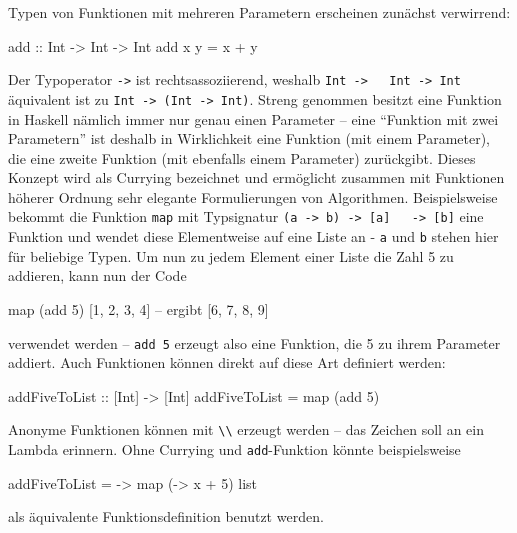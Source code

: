 \documentclass[12pt, a4paper, bibgerm]{scrbook}
\newenvironment{DIFnomarkup}{}{}
\newcommand\icode[1]{\lstinline?#1?}
\begin{document}
Typen von Funktionen mit mehreren Parametern erscheinen
zunächst verwirrend:
\begin{DIFnomarkup}\begin{code}
add :: Int -> Int -> Int
add x y = x + y  
\end{code}\end{DIFnomarkup}
Der Typoperator \icode{->} ist rechtsassoziierend, weshalb \icode{Int ->
  Int -> Int} äquivalent ist zu \icode{Int -> (Int -> Int)}. Streng
genommen besitzt eine Funktion in Haskell nämlich immer nur genau einen
Parameter -- eine "`Funktion mit zwei Parametern"' ist deshalb in
Wirklichkeit eine Funktion (mit einem Parameter), die eine zweite
Funktion (mit ebenfalls einem Parameter) zurückgibt. Dieses Konzept wird
als Currying bezeichnet und ermöglicht zusammen mit Funktionen höherer
Ordnung sehr elegante Formulierungen von Algorithmen. Beispielsweise
bekommt die Funktion \icode{map} mit Typsignatur \icode{(a -> b) -> [a]
  -> [b]} eine Funktion und wendet diese Elementweise auf eine Liste an
- \icode{a} und \icode{b} stehen hier für beliebige Typen. Um nun zu
jedem Element einer Liste die Zahl 5 zu addieren, kann nun der Code
\begin{DIFnomarkup}\begin{code}
map (add 5) [1, 2, 3, 4]  -- ergibt [6, 7, 8, 9]
\end{code}\end{DIFnomarkup}
verwendet werden -- \icode{add 5} erzeugt also eine Funktion, die 5 zu
ihrem Parameter addiert. Auch Funktionen können direkt auf diese Art
definiert werden:
\begin{DIFnomarkup}\begin{code}
addFiveToList :: [Int] -> [Int]
addFiveToList = map (add 5)
\end{code}\end{DIFnomarkup}
Anonyme Funktionen können mit \icode{\\} erzeugt werden -- das Zeichen
soll an ein Lambda erinnern. Ohne Currying und \icode{add}-Funktion
könnte beispielsweise
\begin{code}
addFiveToList = \list -> map (\x -> x + 5) list
\end{code}
als äquivalente Funktionsdefinition benutzt werden.
\end{document}
